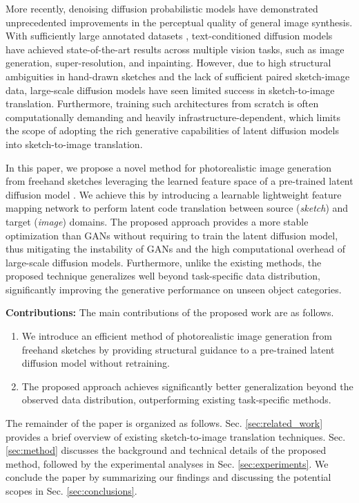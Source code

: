 \noindent
More recently, denoising diffusion probabilistic models \cite{dhariwal2021diffusion,ho2020denoising,nichol2021improved,sohl2015deep} have demonstrated unprecedented improvements in the perceptual quality of general image synthesis. With sufficiently large annotated datasets \cite{schuhmann2022laion,schuhmann2021laion}, text-conditioned diffusion models \cite{ramesh2022hierarchical,ramesh2021zero,rombach2022high,saharia2022photorealistic} have achieved state-of-the-art results across multiple vision tasks, such as image generation, super-resolution, and inpainting. However, due to high structural ambiguities in hand-drawn sketches and the lack of sufficient paired sketch-image data, large-scale diffusion models have seen limited success in sketch-to-image translation. Furthermore, training such architectures from scratch is often computationally demanding and heavily infrastructure-dependent, which limits the scope of adopting the rich generative capabilities of latent diffusion models into sketch-to-image translation.

\noindent
In this paper, we propose a novel method for photorealistic image generation from freehand sketches leveraging the learned feature space of a pre-trained latent diffusion model \cite{rombach2022high}. We achieve this by introducing a learnable lightweight feature mapping network to perform latent code translation between source (\emph{sketch}) and target (\emph{image}) domains. The proposed approach provides a more stable optimization than GANs without requiring to train the latent diffusion model, thus mitigating the instability of GANs and the high computational overhead of large-scale diffusion models. Furthermore, unlike the existing methods, the proposed technique generalizes well beyond task-specific data distribution, significantly improving the generative performance on unseen object categories.

\vspace{1.0em}

\noindent
\textbf{Contributions:} The main contributions of the proposed work are as follows.

\begin{enumerate}
  \item We introduce an efficient method of photorealistic image generation from freehand sketches by providing structural guidance to a pre-trained latent diffusion model without retraining.
  \item The proposed approach achieves significantly better generalization beyond the observed data distribution, outperforming existing task-specific methods.
\end{enumerate}

\noindent
The remainder of the paper is organized as follows. Sec. \ref{sec:related_work} provides a brief overview of existing sketch-to-image translation techniques. Sec. \ref{sec:method} discusses the background and technical details of the proposed method, followed by the experimental analyses in Sec. \ref{sec:experiments}. We conclude the paper by summarizing our findings and discussing the potential scopes in Sec. \ref{sec:conclusions}.

